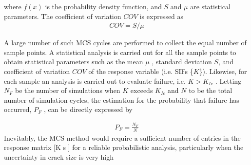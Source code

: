 \documentclass[12pt]{article}
\begin{document}
where $f(x)$ is the probability density function, and $S$ and $\mu$ are statistical parameters. The coefficient of variation $COV$ is expressed as
\begin{align*}
    COV = S/\mu \tag{29}
\end{align*}

A large number of such MCS cycles are performed to collect the equal number of sample points. A statistical analysis is 
carried out for all the sample points to obtain statistical parameters such as the mean $\mu$ , standard deviation $S$, and coefficient of
variation $COV$ of the response variable (i.e. SIFs \{$K$\}). Likewise, for each sample an analysis is carried out to evaluate failure,
i.e. $K > K_{Ic}$ . Letting $N_F$ be the number of simulations when $K$ exceeds $K_{Ic}$ and $N$ to be the total number of simulation cycles, the
estimation for the probability that failure has occurred, $P_F$ , can be directly expressed by

\begin{align*}
    P_F = \frac{N_F}{N} \tag{30}
\end{align*}
Inevitably, the MCS method would require a sufficient number of entries in the response matrix [K s ] for a reliable 
probabilistic analysis, particularly when the uncertainty in crack size is very high
\end{document}
